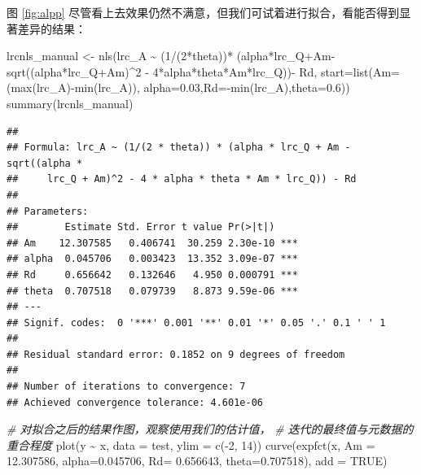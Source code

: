 \documentclass[
]{krantz}
\makeatletter
\newenvironment{Shaded}{\begin{snugshade}}{\end{snugshade}}
\newcommand{\AttributeTok}[1]{\textcolor[rgb]{0.77,0.63,0.00}{#1}}
\newcommand{\CommentTok}[1]{\textcolor[rgb]{0.56,0.35,0.01}{\textit{#1}}}
\newcommand{\ConstantTok}[1]{\textcolor[rgb]{0.00,0.00,0.00}{#1}}
\newcommand{\DecValTok}[1]{\textcolor[rgb]{0.00,0.00,0.81}{#1}}
\newcommand{\FloatTok}[1]{\textcolor[rgb]{0.00,0.00,0.81}{#1}}
\newcommand{\FunctionTok}[1]{\textcolor[rgb]{0.00,0.00,0.00}{#1}}
\newcommand{\NormalTok}[1]{#1}
\newcommand{\OtherTok}[1]{\textcolor[rgb]{0.56,0.35,0.01}{#1}}
\newcommand{\SpecialCharTok}[1]{\textcolor[rgb]{0.00,0.00,0.00}{#1}}
\newenvironment{kframe}{%
\medskip{}
\setlength{\fboxsep}{.8em}
 \def\at@end@of@kframe{}%
 \ifinner\ifhmode%
  \def\at@end@of@kframe{\end{minipage}}%
  \begin{minipage}{\columnwidth}%
 \fi\fi%
 \def\FrameCommand##1{\hskip\@totalleftmargin \hskip-\fboxsep
 \colorbox{shadecolor}{##1}\hskip-\fboxsep
     \hskip-\linewidth \hskip-\@totalleftmargin \hskip\columnwidth}%
 \MakeFramed {\advance\hsize-\width
   \@totalleftmargin\z@ \linewidth\hsize
   \@setminipage}}%
 {\par\unskip\endMakeFramed%
 \at@end@of@kframe}
\renewenvironment{Shaded}{\begin{kframe}}{\end{kframe}}
\makeatother
\begin{document}
图 \ref{fig:alpp} 尽管看上去效果仍然不满意，但我们可试着进行拟合，看能否得到显著差异的结果：

\begin{Shaded}
\begin{Highlighting}[]
\NormalTok{lrcnls\_manual }\OtherTok{\textless{}{-}} \FunctionTok{nls}\NormalTok{(lrc\_A }\SpecialCharTok{\textasciitilde{}} 
\NormalTok{        (}\DecValTok{1}\SpecialCharTok{/}\NormalTok{(}\DecValTok{2}\SpecialCharTok{*}\NormalTok{theta))}\SpecialCharTok{*}
\NormalTok{        (alpha}\SpecialCharTok{*}\NormalTok{lrc\_Q}\SpecialCharTok{+}\NormalTok{Am}\SpecialCharTok{{-}}\FunctionTok{sqrt}\NormalTok{((alpha}\SpecialCharTok{*}\NormalTok{lrc\_Q}\SpecialCharTok{+}\NormalTok{Am)}\SpecialCharTok{\^{}}\DecValTok{2} \SpecialCharTok{{-}} 
                               \DecValTok{4}\SpecialCharTok{*}\NormalTok{alpha}\SpecialCharTok{*}\NormalTok{theta}\SpecialCharTok{*}\NormalTok{Am}\SpecialCharTok{*}\NormalTok{lrc\_Q))}\SpecialCharTok{{-}} 
\NormalTok{        Rd, }\AttributeTok{start=}\FunctionTok{list}\NormalTok{(}\AttributeTok{Am=}\NormalTok{(}\FunctionTok{max}\NormalTok{(lrc\_A)}\SpecialCharTok{{-}}\FunctionTok{min}\NormalTok{(lrc\_A)),}
                       \AttributeTok{alpha=}\FloatTok{0.03}\NormalTok{,}\AttributeTok{Rd=}\SpecialCharTok{{-}}\FunctionTok{min}\NormalTok{(lrc\_A),}\AttributeTok{theta=}\FloatTok{0.6}\NormalTok{))}
\FunctionTok{summary}\NormalTok{(lrcnls\_manual)}
\end{Highlighting}
\end{Shaded}

\begin{verbatim}
## 
## Formula: lrc_A ~ (1/(2 * theta)) * (alpha * lrc_Q + Am - sqrt((alpha * 
##     lrc_Q + Am)^2 - 4 * alpha * theta * Am * lrc_Q)) - Rd
## 
## Parameters:
##        Estimate Std. Error t value Pr(>|t|)    
## Am    12.307585   0.406741  30.259 2.30e-10 ***
## alpha  0.045706   0.003423  13.352 3.09e-07 ***
## Rd     0.656642   0.132646   4.950 0.000791 ***
## theta  0.707518   0.079739   8.873 9.59e-06 ***
## ---
## Signif. codes:  0 '***' 0.001 '**' 0.01 '*' 0.05 '.' 0.1 ' ' 1
## 
## Residual standard error: 0.1852 on 9 degrees of freedom
## 
## Number of iterations to convergence: 7 
## Achieved convergence tolerance: 4.601e-06
\end{verbatim}

\begin{Shaded}
\begin{Highlighting}[]
\CommentTok{\# 对拟合之后的结果作图，观察使用我们的估计值，}
\CommentTok{\# 迭代的最终值与元数据的重合程度}
\FunctionTok{plot}\NormalTok{(y }\SpecialCharTok{\textasciitilde{}}\NormalTok{ x, }\AttributeTok{data =}\NormalTok{ test, }\AttributeTok{ylim =} \FunctionTok{c}\NormalTok{(}\SpecialCharTok{{-}}\DecValTok{2}\NormalTok{, }\DecValTok{14}\NormalTok{))}
\FunctionTok{curve}\NormalTok{(}\FunctionTok{expfct}\NormalTok{(x, }\AttributeTok{Am =} \FloatTok{12.307586}\NormalTok{,}
     \AttributeTok{alpha=}\FloatTok{0.045706}\NormalTok{, }\AttributeTok{Rd=} \FloatTok{0.656643}\NormalTok{, }\AttributeTok{theta=}\FloatTok{0.707518}\NormalTok{), }\AttributeTok{add =} \ConstantTok{TRUE}\NormalTok{)}
\end{Highlighting}
\end{Shaded}
\end{document}
